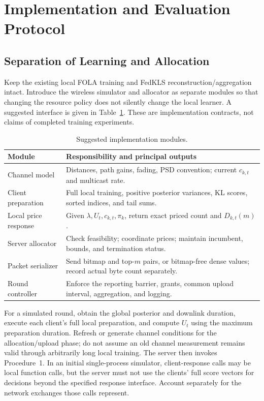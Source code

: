 \section{Implementation and Evaluation Protocol}
\label{sec:implementation}
\subsection{Separation of Learning and Allocation}
Keep the existing local FOLA training and FedKLS reconstruction/aggregation intact. Introduce the wireless simulator and allocator as separate modules so that changing the resource policy does not silently change the local learner. A suggested interface is given in Table~\ref{tab:modules}. These are implementation contracts, not claims of completed training experiments.

\begin{table}[t]
\caption{Suggested implementation modules.}
\label{tab:modules}
\centering\footnotesize
\begin{tabular}{@{}>{\raggedright\arraybackslash}p{}>{\raggedright\arraybackslash}p{}@{}}
\toprule
Module & Responsibility and principal outputs\\
\midrule
Channel model & Distances, path gains, fading, PSD convention; current $c_{k,t}$ and multicast rate.\\
Client preparation & Full local training, positive posterior variances, KL scores, sorted indices, and tail sums.\\
Local price response & Given $\lambda,U_t,c_{k,t},\pi_k$, return exact priced count and $D_{k,t}(m)$.\\
Server allocator & Check feasibility; coordinate prices; maintain incumbent, bounds, and termination status.\\
Packet serializer & Send bitmap and top-$m$ pairs, or bitmap-free dense values; record actual byte count separately.\\
Round controller & Enforce the reporting barrier, grants, common upload interval, aggregation, and logging.\\
\bottomrule
\end{tabular}
\end{table}

For a simulated round, obtain the global posterior and downlink duration, execute each client's full local preparation, and compute $U_t$ using the maximum preparation duration. Refresh or generate channel conditions for the allocation/upload phase; do not assume an old channel measurement remains valid through arbitrarily long local training. The server then invokes Procedure~1. In an initial single-process simulator, client-response calls may be local function calls, but the server must not use the clients' full score vectors for decisions beyond the specified response interface. Account separately for the network exchanges those calls represent.

